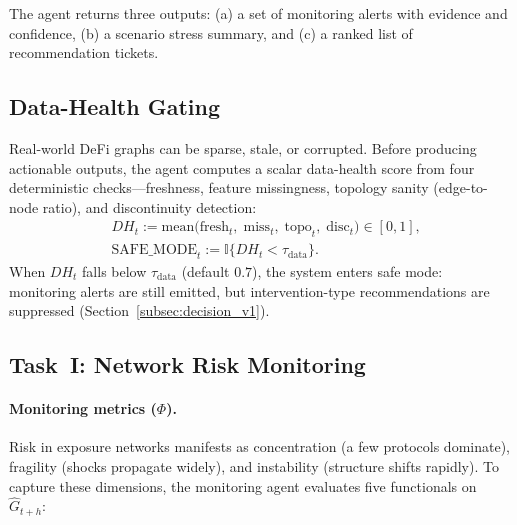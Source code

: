 The agent returns three outputs: (a) a set of monitoring alerts with evidence and confidence, (b) a scenario stress summary, and (c) a ranked list of recommendation tickets.

\subsection{Data-Health Gating}
\label{subsec:data_health_gate}
Real-world DeFi graphs can be sparse, stale, or corrupted. Before producing actionable outputs, the agent computes a scalar data-health score from four deterministic checks---freshness, feature missingness, topology sanity (edge-to-node ratio), and discontinuity detection:
\begin{align}
\label{eq:data_health}
&DH_t := \mathrm{mean}\bigl(\mathrm{fresh}_t,\;\mathrm{miss}_t,\;\mathrm{topo}_t,\;\mathrm{disc}_t\bigr)\in[0,1],\nonumber\\
&\mathrm{SAFE\_MODE}_t := \mathbb{I}\{DH_t<\tau_{\mathrm{data}}\}.
\end{align}
When $DH_t$ falls below $\tau_{\mathrm{data}}$ (default $0.7$), the system enters safe mode: monitoring alerts are still emitted, but intervention-type recommendations are suppressed (Section~\ref{subsec:decision_v1}).

\subsection{Task~I: Network Risk Monitoring}
\label{subsec:task_monitoring}

\paragraph{Monitoring metrics ($\Phi$).}
Risk in exposure networks manifests as concentration (a few protocols dominate), fragility (shocks propagate widely), and instability (structure shifts rapidly). To capture these dimensions, the monitoring agent evaluates five functionals on $\widehat{G}_{t+h}$:

